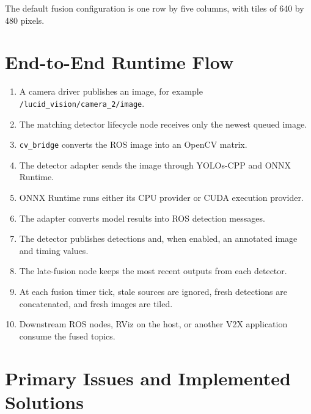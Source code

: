 \documentclass[11pt,a4paper]{article}
\newcommand{\ort}{ONNX Runtime}
\begin{document}
The default fusion configuration is one row by five columns, with tiles of 640 by 480 pixels.

\section{End-to-End Runtime Flow}

\begin{enumerate}
  \item A camera driver publishes an image, for example \texttt{/lucid\_vision/camera\_2/image}.
  \item The matching detector lifecycle node receives only the newest queued image.
  \item \texttt{cv\_bridge} converts the ROS image into an OpenCV matrix.
  \item The detector adapter sends the image through YOLOs-CPP and \ort.
  \item \ort{} runs either its CPU provider or CUDA execution provider.
  \item The adapter converts model results into ROS detection messages.
  \item The detector publishes detections and, when enabled, an annotated image and timing values.
  \item The late-fusion node keeps the most recent outputs from each detector.
  \item At each fusion timer tick, stale sources are ignored, fresh detections are concatenated, and fresh images are tiled.
  \item Downstream ROS nodes, RViz on the host, or another V2X application consume the fused topics.
\end{enumerate}

\section{Primary Issues and Implemented Solutions}
\end{document}
